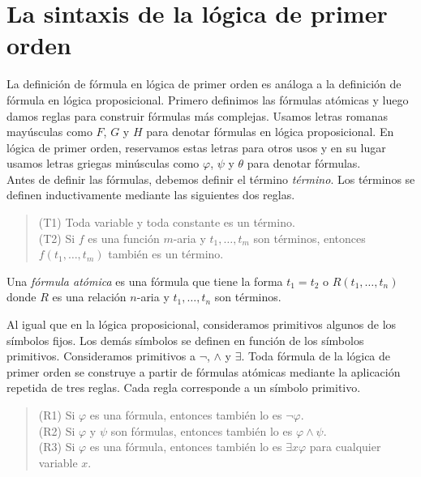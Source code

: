 \message{ !name(main.tex)}\documentclass[12pt,a4paper]{book}
\begin{document}
    \section{La sintaxis de la lógica de primer orden}

    La definición de fórmula en lógica de primer orden es análoga a la definición de fórmula en lógica proposicional.
    Primero definimos las fórmulas atómicas y luego damos reglas para construir fórmulas más complejas. Usamos letras
    romanas mayúsculas como $F$, $G$ y $H$ para denotar fórmulas en lógica proposicional. En lógica de primer orden,
    reservamos estas letras para otros usos y en su lugar usamos letras griegas minúsculas como $\varphi$, $\psi$ y $\theta$
    para denotar fórmulas.\\
    Antes de definir las fórmulas, debemos definir el término \textit{término}. Los términos se definen inductivamente
    mediante las siguientes dos reglas.

    \begin{quote}
        (T1) Toda variable y toda constante es un término.\\
        (T2) Si $f$ es una función $m$-aria y $t_{1},\dots,t_{m}$ son términos, entonces $f(t_{1},\dots,t_{m})$ también es un
        término.
    \end{quote}

    \begin{definicion}\label{def:formula-atomica-fol}
        Una \textit{fórmula atómica} es una fórmula que tiene la forma $t_{1}=t_{2}$ o $R(t_{1},\dots,t_{n})$ donde $R$ es
        una relación $n$-aria y $t_{1},\dots,t_{n}$ son términos.
    \end{definicion}

    Al igual que en la lógica proposicional, consideramos primitivos algunos de los símbolos fijos. Los demás símbolos se
    definen en función de los símbolos primitivos. Consideramos primitivos a $\neg$, $\wedge$ y $\exists$. Toda fórmula de
    la lógica de primer orden se construye a partir de fórmulas atómicas mediante la aplicación repetida de tres reglas.
    Cada regla corresponde a un símbolo primitivo.

    \begin{quote}
        (R1) Si $\varphi$ es una fórmula, entonces también lo es $\neg\varphi$.\\
        (R2) Si $\varphi$ y $\psi$ son fórmulas, entonces también lo es $\varphi\wedge\psi$.\\
        (R3) Si $\varphi$ es una fórmula, entonces también lo es $\exists x\varphi$ para cualquier variable $x$.
    \end{quote}
\end{document}
